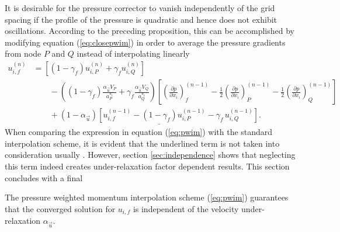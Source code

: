 It is desirable for the pressure corrector to vanish independently of the grid spacing if the profile of the pressure is quadratic and hence does not exhibit oscillations. According to the preceding proposition, this can be accomplished by modifying equation (\ref{eq:closepwim}) in order to average the pressure gradients from node \(P\) and \(Q\) instead of interpolating linearly
\begin{align}
  u_{i,f}^{(n)} 
  &=
  \left[\left(1 - \gamma_f\right) u_{i,P}^{(n)} + \gamma_f u_{i,Q}^{(n)} \right] \nonumber\\[1em]
  &\quad\quad - 
  \left(\left(1 - \gamma_f\right) \frac{\alpha_\vec{u} V_P}{a_P^{u_i}} + \gamma_f \frac{\alpha_\vec{u} V_Q}{a_Q^{u_i}}\right)
  \left[ 
  \left(\frac{\partial p}{\partial x_i}\right)_f^{(n-1)} 
  - \frac{1}{2} \left( \frac{\partial p}{\partial x_i} \right)_P^{(n-1)} 
  - \frac{1}{2} \left(\frac{\partial p}{\partial x_i}\right)_Q^{(n-1)}
  \right] \nonumber \\[1em]
  \label{eq:pwim}
  &\quad\quad + \underline{\left(1 - \alpha_\vec{u}\right) \left[ u_{i,f}^{(n-1)} - \left(1 - \gamma_f\right) u_{i,P}^{(n-1)} - \gamma_f \, u_{i,Q}^{(n-1)} \right]}.
\end{align}
When comparing the expression in equation (\ref{eq:pwim}) with the standard interpolation scheme, it is evident that the underlined term is not taken into consideration usually \cite{ferziger02}. However, section \ref{sec:independence} shows that neglecting this term indeed creates under-relaxation factor dependent results. This section concludes with a final
\begin{prop}
  The pressure weighted momentum interpolation scheme (\ref{eq:pwim}) guarantees that the converged solution for \(u_{i,f}\) is independent of the velocity under-relaxation \(\alpha_\vec{u}\).
\end{prop}
